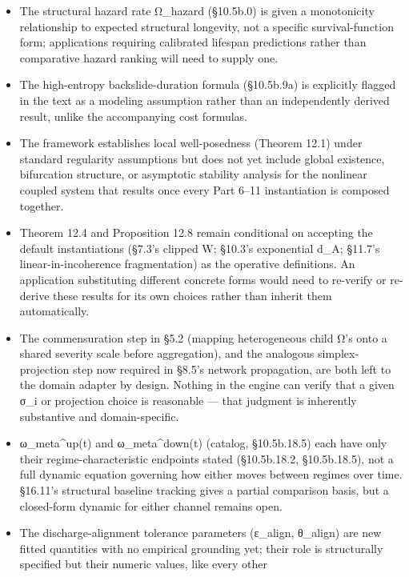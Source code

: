 \documentclass[
]{article}
\begin{document}
\begin{itemize}
  and bifurcation behavior as forcing varies continuously remain
  unresolved in closed form regardless, as before.
\item
  The structural hazard rate Ω\_hazard (§10.5b.0) is given a
  monotonicity relationship to expected structural longevity, not a
  specific survival-function form; applications requiring calibrated
  lifespan predictions rather than comparative hazard ranking will need
  to supply one.
\item
  The high-entropy backslide-duration formula (§10.5b.9a) is explicitly
  flagged in the text as a modeling assumption rather than an
  independently derived result, unlike the accompanying cost formulas.
\item
  The framework establishes local well-posedness (Theorem 12.1) under
  standard regularity assumptions but does not yet include global
  existence, bifurcation structure, or asymptotic stability analysis for
  the nonlinear coupled system that results once every Part 6--11
  instantiation is composed together.
\item
  Theorem 12.4 and Proposition 12.8 remain conditional on accepting the
  default instantiations (§7.3's clipped W; §10.3's exponential d\_A;
  §11.7's linear-in-incoherence fragmentation) as the operative
  definitions. An application substituting different concrete forms
  would need to re-verify or re-derive these results for its own choices
  rather than inherit them automatically.
\item
  The commensuration step in §5.2 (mapping heterogeneous child Ω's onto
  a shared severity scale before aggregation), and the analogous
  simplex-projection step now required in §8.5's network propagation,
  are both left to the domain adapter by design. Nothing in the engine
  can verify that a given σ\_i or projection choice is reasonable ---
  that judgment is inherently substantive and domain-specific.
\item
  ω\_meta\^{}up(t) and ω\_meta\^{}down(t) (catalog, §10.5b.18.5) each
  have only their regime-characteristic endpoints stated (§10.5b.18.2,
  §10.5b.18.5), not a full dynamic equation governing how either moves
  between regimes over time. §16.11's structural baseline tracking gives
  a partial comparison basis, but a closed-form dynamic for either
  channel remains open.
\item
  The discharge-alignment tolerance parameters (ε\_align, θ\_align) are
  new fitted quantities with no empirical grounding yet; their role is
  structurally specified but their numeric values, like every other

\end{itemize}
\end{document}
